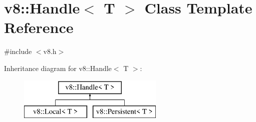 \hypertarget{classv8_1_1_handle}{}\section{v8\+:\+:Handle$<$ T $>$ Class Template Reference}
\label{classv8_1_1_handle}


{\ttfamily \#include $<$v8.\+h$>$}

Inheritance diagram for v8\+:\+:Handle$<$ T $>$\+:\begin{figure}[H]
\begin{center}
\leavevmode
\includegraphics[height=2.000000cm]{classv8_1_1_handle}
\end{center}
\end{figure}
